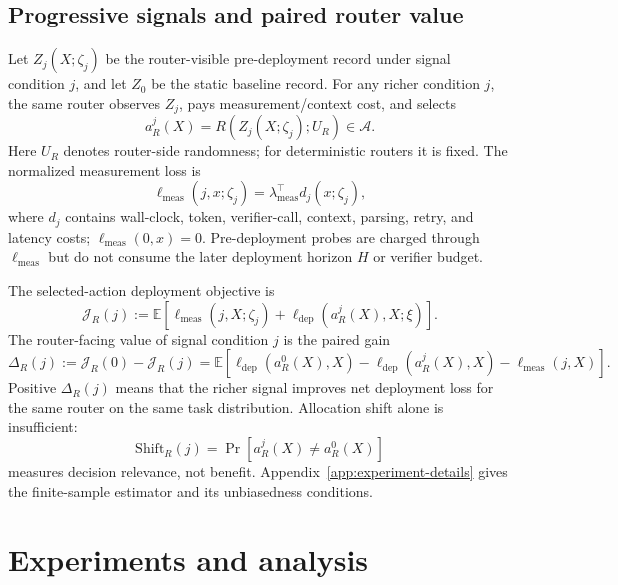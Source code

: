 \documentclass{article}
\newcommand{\cA}{\mathcal{A}}
\newcommand{\E}{\mathbb{E}}
\newcommand{\J}{\mathcal{J}}
\begin{document}
\subsection{Progressive signals and paired router value}
\label{subsec:paired}

Let $Z_j(X;\zeta_j)$ be the router-visible pre-deployment record under signal condition $j$, and let $Z_0$ be the static baseline record.
For any richer condition \(j\), the same router observes \(Z_j\), pays measurement/context cost, and selects
\[
a_R^j(X)=R(Z_j(X;\zeta_j);U_R)\in\cA .
\]
Here \(U_R\) denotes router-side randomness; for deterministic routers it is fixed.
The normalized measurement loss is
\[
\ell_{\mathrm{meas}}(j,x;\zeta_j)
=
\lambda_{\mathrm{meas}}^\top d_j(x;\zeta_j),
\]
where \(d_j\) contains wall-clock, token, verifier-call, context, parsing, retry, and latency costs; \(\ell_{\mathrm{meas}}(0,x)=0\).
Pre-deployment probes are charged through \(\ell_{\mathrm{meas}}\) but do not consume the later deployment horizon \(H\) or verifier budget.

The selected-action deployment objective is
\begin{equation}
\J_R(j)
:=
\E\left[
\ell_{\mathrm{meas}}(j,X;\zeta_j)
+\ell_{\mathrm{dep}}(a_R^j(X),X;\xi)
\right].
\label{eq:router-objective}
\end{equation}
The router-facing value of signal condition $j$ is the paired gain
\begin{equation}
\Delta_R(j)
:=
\J_R(0)-\J_R(j)
=
\E\!\left[
\ell_{\mathrm{dep}}(a_R^0(X),X)
-
\ell_{\mathrm{dep}}(a_R^j(X),X)
-
\ell_{\mathrm{meas}}(j,X)
\right].
\label{eq:router-gain}
\end{equation}
Positive $\Delta_R(j)$ means that the richer signal improves net deployment loss for the same router on the same task distribution.
Allocation shift alone is insufficient:
\[
\mathrm{Shift}_R(j)=\Pr[a_R^j(X)\neq a_R^0(X)]
\]
measures decision relevance, not benefit.
Appendix~\ref{app:experiment-details} gives the finite-sample estimator and its unbiasedness conditions.


\section{Experiments and analysis}
\label{sec:experiments}
\end{document}
